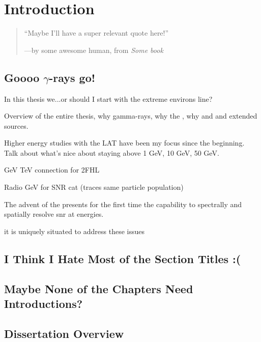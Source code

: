 \chapter{Introduction}
\label{chap:intro}

\begin{quote}
	``Maybe I'll have a super relevant quote here!'' 
	\begin{center}---by some awesome human, from \it{Some book} \end{center}
\end{quote}

\section{Goooo $\gamma$-rays go!}

In this thesis we...or should I start with the extreme environs line?

Overview of the entire thesis, why gamma-rays, why the \lat, why \snr and \pwn and extended sources.

Higher energy studies with the LAT have been my focus since the beginning. Talk about what's nice about staying above 1 GeV, 10 GeV, 50 GeV. 

GeV TeV connection for 2FHL

Radio GeV for SNR cat (traces same particle population)

The advent of the \lat presents for the first time the capability to spectrally and spatially resolve \gls{snr} at \gev energies.

it is uniquely situated to address these issues
\section{I Think I Hate Most of the Section Titles :(}

\section{Maybe None of the Chapters Need Introductions?}

\section{Dissertation Overview}


